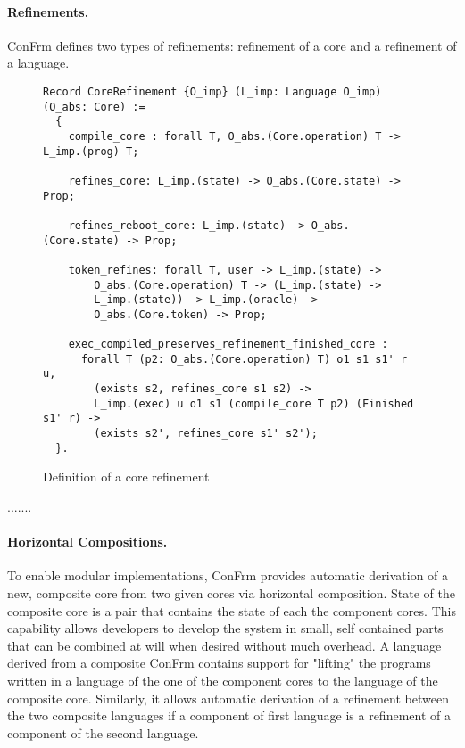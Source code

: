 \paragraph{Refinements.}
ConFrm defines two types of refinements: refinement of a core and a refinement of a language. 

\begin{figure}[ht]
    \centering
    \begin{verbatim}
Record CoreRefinement {O_imp} (L_imp: Language O_imp) (O_abs: Core) :=
  {
    compile_core : forall T, O_abs.(Core.operation) T -> L_imp.(prog) T;
    
    refines_core: L_imp.(state) -> O_abs.(Core.state) -> Prop;
    
    refines_reboot_core: L_imp.(state) -> O_abs.(Core.state) -> Prop;
    
    token_refines: forall T, user -> L_imp.(state) -> 
        O_abs.(Core.operation) T -> (L_imp.(state) -> 
        L_imp.(state)) -> L_imp.(oracle) -> 
        O_abs.(Core.token) -> Prop;
    
    exec_compiled_preserves_refinement_finished_core :
      forall T (p2: O_abs.(Core.operation) T) o1 s1 s1' r u,
        (exists s2, refines_core s1 s2) ->
        L_imp.(exec) u o1 s1 (compile_core T p2) (Finished s1' r) ->
        (exists s2', refines_core s1' s2');
  }.
    \end{verbatim}
    \caption{Definition of a core refinement}
    \label{fig:Core_Definition}
\end{figure}

.......

\paragraph{Horizontal Compositions.}
To enable modular implementations, ConFrm provides automatic derivation of a new, composite core from two given cores via horizontal composition. State of the composite core is a pair that contains the state of each the component cores. This capability allows developers to develop the system in small, self contained parts that can be combined at will when desired without much overhead. A language derived from a composite ConFrm contains support for "lifting" the programs written in a language of the one of the component cores to the language of the composite core. Similarly, it allows automatic derivation of a refinement between the two composite languages if a component of first language is a refinement of a component of the second language.

